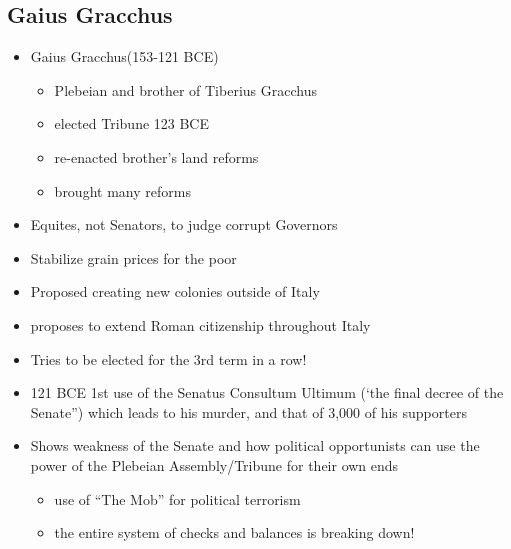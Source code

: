 \documentclass[12pt, twoside]{article}
\begin{document}
\subsection{Gaius Gracchus}
\begin{itemize}
\item Gaius Gracchus(153-121 BCE)
	\begin{itemize}
	\item Plebeian and brother of Tiberius Gracchus
	\item elected Tribune 123 BCE
	\item re-enacted brother's land reforms
	\item brought many reforms
	\end{itemize}
\item Equites, not Senators, to judge corrupt Governors
\item Stabilize grain prices for the poor
\item Proposed creating new colonies outside of Italy
\item proposes to extend Roman citizenship throughout Italy
\item Tries to be elected for the 3rd term in a row!
\item 121 BCE  1st use of the Senatus Consultum Ultimum (‘the final decree of the Senate”)  which leads to his murder, and that of 3,000 of his supporters
\item Shows weakness of the Senate and how political opportunists can use the power of the Plebeian Assembly/Tribune for their own ends
	\begin{itemize}
	\item use of “The Mob” for political terrorism
	\item the entire system of checks and balances is breaking down!
	\end{itemize}
\end{itemize}
\end{document}
